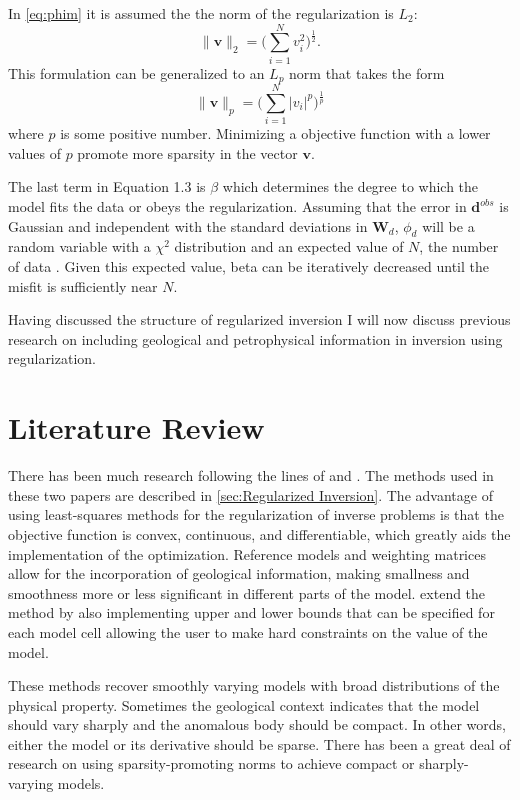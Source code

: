 In \autoref{eq:phim} it is assumed the the norm of the regularization is $L_2$: 
\begin{equation}
\|\mathbf v\|_2 = \Big(\sum_{i=1}^N v_i^2\Big)^{\frac{1}{2}}.
\end{equation}
\label{eq:l2}
This formulation can be generalized to an $L_p$ norm that takes the form
\begin{equation}
\|\mathbf v\|_p = \Big(\sum_{i=1}^N |v_i|^p\Big)^{\frac{1}{p}}
\end{equation}
\label{eq:lp}
where $p$ is some positive number. Minimizing a objective function with a lower values of $p$ promote more sparsity in the vector $\mathbf v$.

The last term in Equation 1.3 is $\beta$ which determines the degree to which the model fits the data or obeys the regularization. Assuming that the error in $\mathbf d^{obs}$ is Gaussian  and  independent with the standard deviations in $\mathbf W_d$, $\phi_d$ will be a random variable with a $\chi^2$ distribution and an expected value of $N$, the number of data \cite{oldenburg2005inversion}. Given this expected value, beta can be iteratively decreased until the misfit is sufficiently near $N$.

Having discussed the structure of regularized inversion I will now discuss previous research on including geological and petrophysical information in inversion using regularization.

\section{Literature Review}
\label{sec:Literature Review}

There has been much research following the lines of \cite{li19963} and \cite{li19983}. The methods used in these two papers are described in \autoref{sec:Regularized Inversion}. The advantage of using least-squares methods for the regularization of inverse problems is that the objective function is convex, continuous, and differentiable, which greatly aids the implementation of the optimization. Reference models and weighting matrices allow for the incorporation of geological information, making smallness and smoothness more or less significant in different parts of the model. \cite{li2003fast} extend the method by also implementing upper and lower bounds that can be specified for each model cell allowing the user to make hard constraints on the value of the model.

These methods recover smoothly varying models with broad distributions of the physical property. Sometimes the geological context indicates that the model should vary sharply and the anomalous body should be compact. In other words, either the model or its derivative should be sparse. There has been a great deal of research on using sparsity-promoting norms to achieve compact or sharply-varying models.

